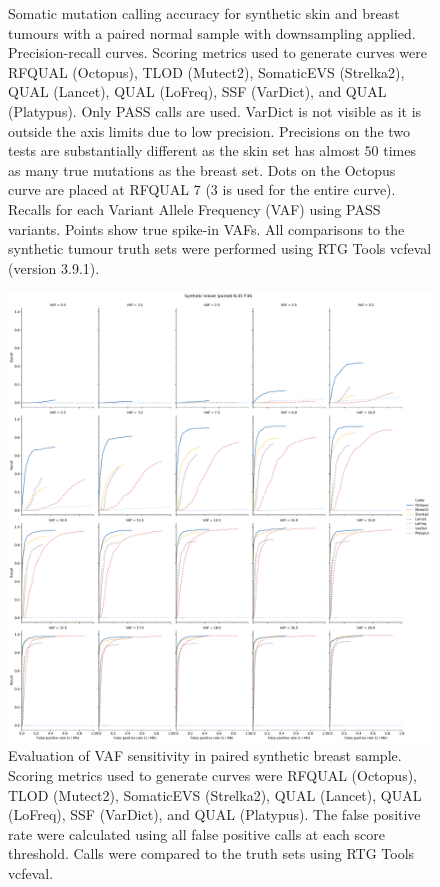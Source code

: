 \documentclass{article}
\begin{document}
\begin{figure}[ht!]
\begin{subfigure}[b]{\textwidth}
        \caption{}
        \label{supfig:paired-somatic-vaf-recall}
    \end{subfigure}
    \caption{Somatic mutation calling accuracy for synthetic skin and breast tumours with a paired normal sample with downsampling applied. \textbf{} Precision-recall curves. Scoring metrics used to generate curves were RFQUAL (Octopus), TLOD (Mutect2), SomaticEVS (Strelka2), QUAL (Lancet), QUAL (LoFreq), SSF (VarDict), and QUAL (Platypus). Only PASS calls are used. VarDict is not visible as it is outside the axis limits due to low precision. Precisions on the two tests are substantially different as the skin set has almost $50$ times as many true mutations as the breast set. Dots on the Octopus curve are placed at RFQUAL 7 (3 is used for the entire curve). \textbf{} Recalls for each Variant Allele Frequency (VAF) using PASS variants. Points show true spike-in VAFs. All comparisons to the synthetic tumour truth sets were performed using RTG Tools vcfeval (version 3.9.1).} 
    \label{supfig:synthetic-tumours}
\end{figure}

\clearpage

\begin{figure}[ht!]
    \centering
    \includegraphics[width=\textwidth]{figures/paired_somatic_breast_n35_t65_vaf_recall.pdf}
    \caption{Evaluation of VAF sensitivity in paired synthetic breast sample. Scoring metrics used to generate curves were RFQUAL (Octopus), TLOD (Mutect2), SomaticEVS (Strelka2), QUAL (Lancet), QUAL (LoFreq), SSF (VarDict), and QUAL (Platypus). The false positive rate were calculated using all false positive calls at each score threshold. Calls were compared to the truth sets using RTG Tools vcfeval.}
    \label{supfig:paired-somatic-breast-n35-t65-vaf}
\end{figure}
\end{document}
